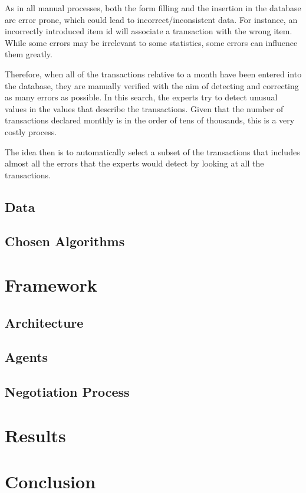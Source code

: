 \documentclass{llncs}
\begin{document}
As in all manual processes, both the form filling and the insertion in the database are error prone, which could lead to incorrect/inconsistent data. For instance, an incorrectly introduced item id will associate a transaction with the wrong item. While some errors may be irrelevant to some statistics, some errors can influence them greatly.

Therefore, when all of the transactions relative to a month have been entered into the database, they are manually verified with
the aim of detecting and correcting as many errors as possible. In this search, the experts try to detect unusual values in the values that describe the transactions.
Given that the number of transactions declared monthly is in the order of tens of thousands, this is a very costly process.

The idea then is to automatically select a subset of the
transactions that includes almost all the errors that the experts would detect by looking at all the transactions.


\subsection{Data}

\subsection{Chosen Algorithms}


\section{Framework}


\subsection{Architecture}

\subsection{Agents}

\subsection{Negotiation Process}



\section{Results}


\section{Conclusion}

 
\begin{thebibliography}{9}

\end{thebibliography}
\end{document}
